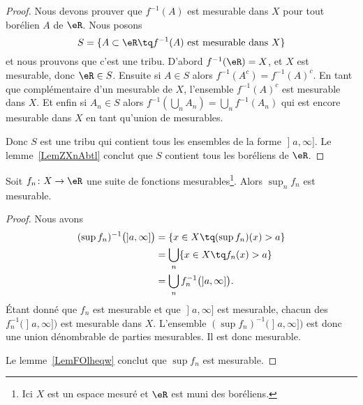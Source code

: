 \begin{proof}
	Nous devons prouver que \( f^{-1}(A)\) est mesurable dans \( X\) pour tout borélien \( A\) de \( \eR\). Nous posons
	\begin{equation}
		S=\{ A\subset \eR\tq f^{-1}(A)\text{ est mesurable dans } X \}
	\end{equation}
	et nous prouvons que c'est une tribu. D'abord \( f^{-1}(\eR)=X\), et \( X\) est mesurable, donc \( \eR\in S\). Ensuite si \( A\in S\) alors \( f^{-1}(A^c)=f^{-1}(A)^c\). En tant que complémentaire d'un mesurable de \( X\), l'ensemble \( f^{-1}(A)^c\) est mesurable dans \( X\). Et enfin si \( A_n\in S \) alors \( f^{-1}(\bigcup_nA_n)=\bigcup_nf^{-1}(A_n)\) qui est encore mesurable dans \( X\) en tant qu'union de mesurables.

	Donc \( S\) est une tribu qui contient tous les ensembles de la forme \( \mathopen] a , \infty \mathclose]\). Le lemme~\ref{LemZXnAbtl} conclut que \( S\) contient tous les boréliens de \( \eR\).
\end{proof}

\begin{lemma}   \label{LemIGKvbNR}
	Soit \( f_n\colon X\to \eR\) une suite de fonctions mesurables\footnote{Ici \( X\) est un espace mesuré et \( \eR\) est muni des boréliens.}. Alors \( \sup_n f_n\) est mesurable.
\end{lemma}

\begin{proof}
	Nous avons
	\begin{subequations}
		\begin{align}
			(\sup f_n)^{-1}\big( \mathopen] a , \infty \mathclose] \big) & =\{ x\in X \tq (\sup f_n)(x)>a \}                                \\
			                                                             & =\bigcup_n\{ x\in X\tq f_n(x)>a \}                               \\
			                                                             & =\bigcup_nf_n^{-1}\big( \mathopen] a , \infty \mathclose] \big).
		\end{align}
	\end{subequations}
	Étant donné que \( f_n\) est mesurable et que \( \mathopen] a , \infty \mathclose]\) est mesurable, chacun des \( f_n^{-1}\big( \mathopen] a , \infty \mathclose] \big) \) est mesurable dans \( X\). L'ensemble \( (\sup f_n)^{-1}\big( \mathopen] a , \infty \mathclose] \big)\) est donc une union dénombrable de parties mesurables. Il est donc mesurable.

	Le lemme~\ref{LemFOlheqw} conclut que \( \sup f_n\) est mesurable.
\end{proof}

